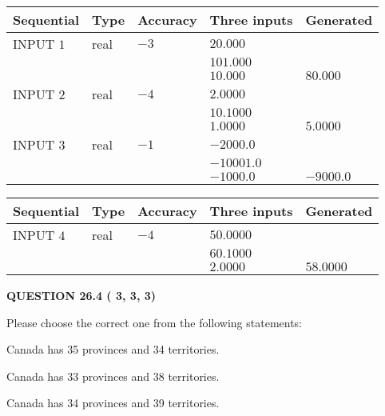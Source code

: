 \documentclass[12pt]{article}
\begin{document}
   
  
  
\noindent\begin{tabular}{|l|l|l|l|l|}
\hline
 Sequential & Type & Accuracy & Three inputs & Generated \\ 
\hline
 
 
  INPUT $           1$ & real & $          -3 $ & $
 20.000
  $ & \\
  & & &  $
 101.000
  $ & \\
  & & &  $
 10.000
 $ & $ 80.000 $ 
 \\  \hline  
 
 
  INPUT $           2$ & real & $          -4 $ & $
 2.0000
  $ & \\
  & & &  $
 10.1000
  $ & \\
  & & &  $
 1.0000
 $ & $ 5.0000 $ 
 \\  \hline  
 
 
  INPUT $           3$ & real & $          -1 $ & $
 -2000.0
  $ & \\
  & & &  $
 -10001.0
  $ & \\
  & & &  $
 -1000.0
 $ & $ -9000.0 $ 
 \\  \hline  
 \end{tabular}
   
   
  
  
\noindent\begin{tabular}{|l|l|l|l|l|}
\hline
 Sequential & Type & Accuracy & Three inputs & Generated \\ 
\hline
 
 
  INPUT $           4$ & real & $          -4 $ & $
 50.0000
  $ & \\
  & & &  $
 60.1000
  $ & \\
  & & &  $
 2.0000
 $ & $ 58.0000 $ 
 \\  \hline  
 \end{tabular}
   
   
  
\vspace{0.2in}
  
{\textbf{\Large{QUESTION
26.4 
 (          3,          3,          3)
}}}
  
  
Please choose the correct one from the following statements:
 
 
Canada has  %
35 provinces and  %
34 territories.
 
 
Canada has  %
33 provinces and  %
38 territories.
 
 
Canada has  %
34 provinces and  %
39 territories.
 
\end{document}
